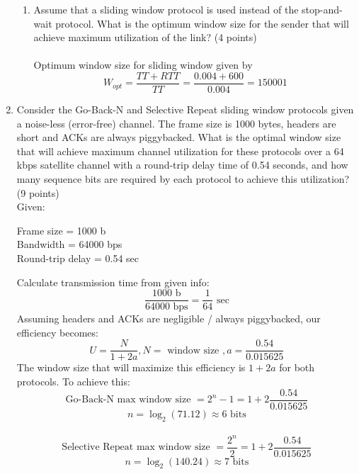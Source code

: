 \documentclass[12pt]{article}
\begin{document}
\begin{enumerate}
\begin{enumerate}
  \item Assume that a sliding window protocol is used instead of the stop-and-wait protocol.  What is the optimum window size for the sender that will achieve maximum utilization of the link?  (4 points) \\ \\
    Optimum window size for sliding window given by 
    \[ W_{opt} = \frac{TT + RTT}{TT} = \frac{0.004+600}{0.004} = 150001 \]
  \end{enumerate}

\newpage 

\item Consider the Go-Back-N and Selective Repeat sliding window protocols given a noise-less (error-free) channel. The frame size is 1000 bytes, headers are short and ACKs are always piggybacked. What is the optimal window size that will achieve maximum channel utilization for these protocols over a 64 kbps satellite channel with a round-trip delay time of 0.54 seconds, and how many sequence bits are required by each protocol to achieve this utilization? (9 points) \\ 
  Given: 
  \begin{center}
    Frame size = 1000 b\\
    Bandwidth = 64000 bps\\
    Round-trip delay = 0.54 sec \\
  \end{center}
  Calculate transmission time from given info:
  \[ \frac{1000 \text { b}}{64000 \text{ bps}} = \frac{1}{64} \text{ sec}\]
  Assuming headers and ACKs are negligible / always piggybacked, our efficiency becomes:
  \[ U = \frac{N}{1+2a}, N = \text{ window size }, a = \frac{0.54}{0.015625} \]
  The window size that will maximize this efficiency is $1 + 2a$ for both protocols. To achieve this:
  \[ \text{Go-Back-N max window size } = 2^n-1 = 1 + 2\frac{0.54}{0.015625} \]
  \[ n = \log_2(71.12) \approx 6 \text{ bits} \] ~\\
  \[ \text{Selective Repeat max window size } = \frac{2^n}{2} = 1 + 2\frac{0.54}{0.015625} \]
  \[ n = \log_2(140.24) \approx 7 \text{ bits} \]

\newpage


\end{enumerate}
\end{document}

